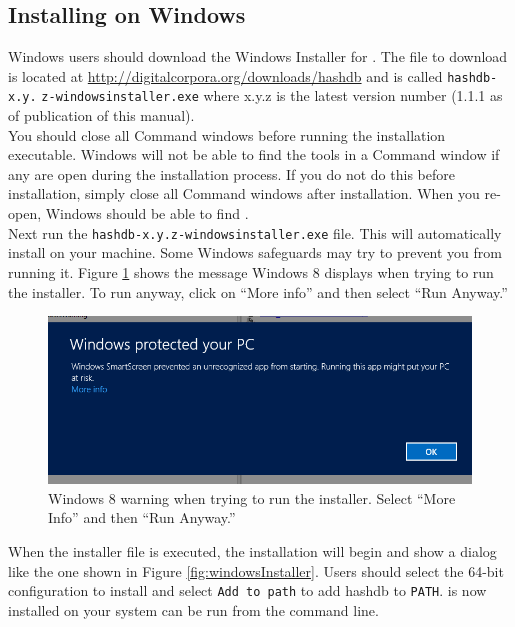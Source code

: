 \documentclass[11pt,fleqn]{article} %
\begin{document}
\subsection{Installing on Windows}
\label{InstallingOnWindows}
Windows users should download the Windows Installer for \hdb. The file to download is located at \url{http://digitalcorpora.org/downloads/hashdb} and is called \texttt{hashdb-x.y.} \texttt{z-windowsinstaller.exe} where x.y.z is the latest version number (1.1.1 as of publication of this manual).\\

You should close all Command windows before running the installation executable. Windows will not be able to find the \hdb tools in a Command window if any are open during the installation process. If you do not do this before installation, simply close all Command windows after installation. When you re-open, Windows should be able to find \hdb.\\


 Next run the \texttt{hashdb-x.y.z-windowsinstaller.exe} file. This will automatically install \hdb on your machine. Some Windows safeguards may try to prevent you from running it. Figure \ref{fig:windowsWarning} shows the message Windows 8 displays when trying to run the installer. To run anyway, click on ``More info'' and then select ``Run Anyway.'' \\
\begin{figure}
	\center
	\includegraphics[scale=.5]{windowsWarning.png}
	\caption{Windows 8 warning when trying to run the installer. Select ``More Info'' and then ``Run Anyway.''}
	\label{fig:windowsWarning}
\end{figure}

When the installer file is executed, the installation will begin and show a dialog like the one shown in Figure \ref{fig:windowsInstaller}.  Users should select the 64-bit configuration to install \hdb and select \verb+Add to path+ to add hashdb to \verb+PATH+. \hdb is now installed on your system can be run from the command line.\\
\end{document}
